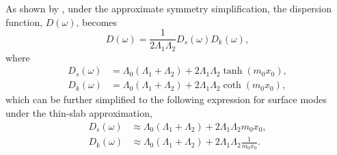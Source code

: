 \documentclass[12pt]{article}
\begin{document}
As shown by \citep{all_etal17}, under the approximate symmetry simplification, the dispersion function, $D(\omega)$, becomes
\begin{equation}
D(\omega) = \frac{1}{2\Lambda_1\Lambda_2} D_s(\omega)D_k(\omega),
\end{equation}
where
\begin{align}
D_s(\omega) &= \Lambda_0(\Lambda_1 + \Lambda_2) + 2\Lambda_1\Lambda_2\tanh(m_0x_0), \\
D_k(\omega) &= \Lambda_0(\Lambda_1 + \Lambda_2) + 2\Lambda_1\Lambda_2\coth(m_0x_0),
\end{align}
which can be further simplified to the following expression for surface modes under the thin-slab approximation,
\begin{align}
D_s(\omega) &\approx \Lambda_0(\Lambda_1 + \Lambda_2) + 2\Lambda_1\Lambda_2m_0x_0, \\
D_k(\omega) &\approx \Lambda_0(\Lambda_1 + \Lambda_2) + 2\Lambda_1\Lambda_2\frac{1}{m_0x_0}.
\end{align}
\end{document}
